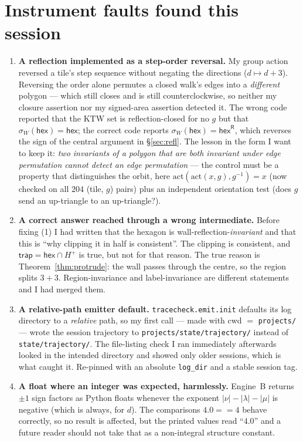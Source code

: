 \documentclass[11pt]{article}
\theoremstyle{definition}
\newcommand{\hex}{\mathsf{hex}}
\newcommand{\hexR}{\mathsf{hex}^{\mathsf{R}}}
\newcommand{\trap}{\mathsf{trap}}
\newcommand{\la}{\lambda}
\begin{document}
\section{Instrument faults found this session}

\begin{enumerate}
\item \textbf{A reflection implemented as a step-order reversal.} My group
action reversed a tile's step sequence without negating the directions
($d\mapsto d+3$). Reversing the order alone permutes a closed walk's edges into
a \emph{different} polygon --- which still closes and is still
counterclockwise, so neither my closure assertion nor my signed-area assertion
detected it. The wrong code reported that the KTW set is reflection-closed for
no $g$ but that $\sigma_W(\hex)=\hex$; the correct code reports
$\sigma_W(\hex)=\hexR$, which reverses the sign of the central argument in
\S\ref{sec:refl}. The lesson in the form I want to keep it:
\emph{two invariants of a polygon that are both invariant under edge
permutation cannot detect an edge permutation} --- the control must be a
property that distinguishes the orbit, here
$\mathrm{act}(\mathrm{act}(x,g),g^{-1})=x$ (now checked on all $204$
(tile, $g$) pairs) plus an independent orientation test
(does $g$ send an up-triangle to an up-triangle?).

\item \textbf{A correct answer reached through a wrong intermediate.} Before
fixing (1) I had written that the hexagon is wall-reflection-\emph{invariant}
and that this is ``why clipping it in half is consistent''. The clipping is
consistent, and $\trap=\hex\cap H^{+}$ is true, but not for that reason. The
true reason is Theorem~\ref{thm:protrude}: the wall passes through the centre,
so the region splits $3+3$. Region-invariance and label-invariance are different
statements and I had merged them.

\item \textbf{A relative-path emitter default.} \texttt{tracecheck.emit.init}
defaults its log directory to a \emph{relative} path, so my first call --- made
with cwd $=$ \texttt{projects/} --- wrote the session trajectory to
\texttt{projects/state/trajectory/} instead of \texttt{state/trajectory/}. The
file-listing check I ran immediately afterwards looked in the intended
directory and showed only older sessions, which is what caught it. Re-pinned
with an absolute \texttt{log\_dir} and a stable session tag.

\item \textbf{A float where an integer was expected, harmlessly.} Engine~B
returns $\pm1$ sign factors as Python floats whenever the exponent
$|\nu|-|\la|-|\mu|$ is negative (which is always, for $d$). The comparisons
$4.0 == 4$ behave correctly, so no result is affected, but the printed values
read ``$4.0$'' and a future reader should not take that as a non-integral
structure constant.
\end{enumerate}
\end{document}
